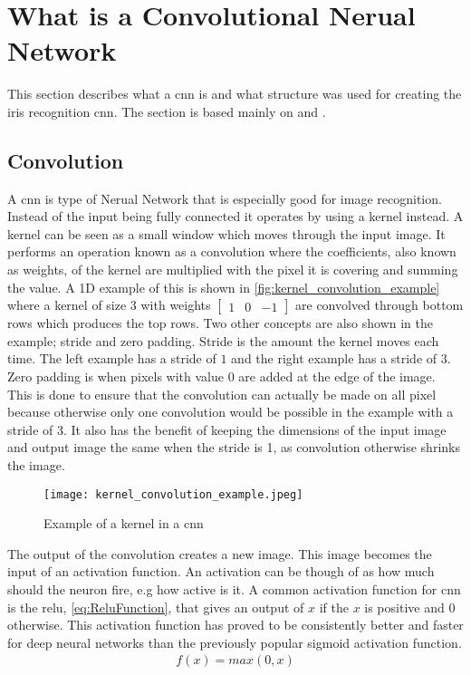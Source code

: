 \section{What is a Convolutional Nerual Network}
\label{sec:cnn_theory}
This section describes what a \gls{cnn} is and what structure was used for creating the iris recognition \gls{cnn}. The section is based mainly on \cite{Karpathy2016a} and \cite{Nielsen2015}.

\subsection{Convolution}
A \gls{cnn} is type of Nerual Network that is especially good for image recognition. Instead of the input being fully connected it operates by using a kernel instead. A kernel can be seen as a small window which moves through the input image. It performs an operation known as a convolution where the coefficients, also known as weights, of the kernel are multiplied with the pixel it is covering and summing the value. A 1D example of this is shown in \autoref{fig:kernel_convolution_example} where a kernel of size 3 with weights $\begin{bmatrix} 1 & 0 & -1 \end{bmatrix}$ are convolved through bottom rows which produces the top rows. Two other concepts are also shown in the example; stride and zero padding. Stride is the amount the kernel moves each time. The left example has a stride of $1$ and the right example has a stride of $3$. Zero padding is when pixels with value $0$ are added at the edge of the image. This is done to ensure that the convolution can actually be made on all pixel because otherwise only one convolution would be possible in the example with a stride of 3. It also has the benefit of keeping the dimensions of the input image and output image the same when the stride is 1, as convolution otherwise shrinks the image. 

\begin{figure}[h]
\centering
\texttt{[image: kernel\_convolution\_example.jpeg]}
\caption{Example of a kernel in a \gls{cnn} \citep{Karpathy2016a}}
\label{fig:kernel_convolution_example}
\end{figure}

The output of the convolution creates a new image. This image becomes the input of an activation function. An activation can be though of as how much should the neuron fire, e.g how active is it. A common activation function for \gls{cnn} is the \gls{relu}, \autoref{eq:ReluFunction}, that gives an output of $x$ if the $x$ is positive and 0 otherwise. This activation function has proved to be consistently better and faster for deep neural networks than the previously popular sigmoid activation function.  
\begin{eqnarray}
\label{eq:ReluFunction}
f(x) = max(0,x)
\end{eqnarray}

